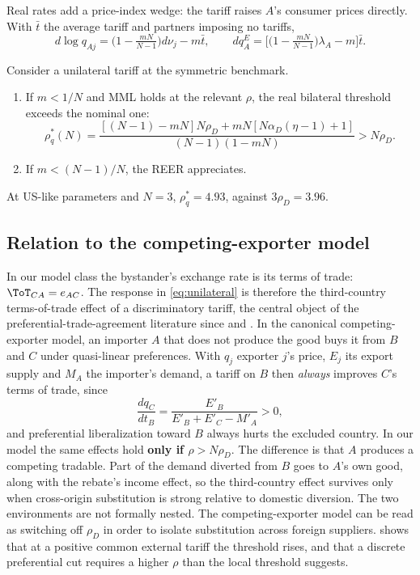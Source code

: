 Real rates add a price-index wedge: the tariff raises $A$'s consumer prices directly. With $\bar t$ the average tariff and partners imposing no tariffs,
\begin{equation}
d\log q_{Aj}=\Big(1-\tfrac{mN}{N-1}\Big)d\nu_j-m\bar t,\qquad
dq^E_A=\Big[\Big(1-\tfrac{mN}{N-1}\Big)\lambda_A-m\Big]\bar t.
\label{eq:real}
\end{equation}

\begin{proposition}
\label{prop:real}
Consider a unilateral tariff at the symmetric benchmark.
\begin{enumerate}[label=(\roman*)]
\item If $m<1/N$ and MML holds at the relevant $\rho$, the real bilateral threshold exceeds the nominal one:
\begin{equation*}
\rho^*_q(N)=\frac{[(N-1)-mN]N\rho_D+mN[N\alpha_D(\eta-1)+1]}{(N-1)(1-mN)}>N\rho_D.
\end{equation*}
\item If $m<(N-1)/N$, the REER appreciates.
\end{enumerate}
\end{proposition}

At US-like parameters and $N=3$, $\rho^*_q=4.93$, against $3\rho_D=3.96$.

\subsection{Relation to the competing-exporter model}
\label{sec:pta}

In our model class the bystander's exchange rate is its terms of trade: $\ToT_{CA}=e_{AC}$. The response in \cref{eq:unilateral} is therefore the third-country terms-of-trade effect of a discriminatory tariff, the central object of the preferential-trade-agreement literature since \citet{viner1950} and \citet{mundell1964}. In the canonical competing-exporter model, an importer $A$ that does not produce the good buys it from $B$ and $C$ under quasi-linear preferences. With $q_j$ exporter $j$'s price, $E_j$ its export supply and $M_A$ the importer's demand, a tariff on $B$ then \emph{always} improves $C$'s terms of trade, since
\begin{equation*}
\frac{dq_C}{dt_B}=\frac{E'_B}{E'_B+E'_C-M'_A}>0,
\end{equation*}
and preferential liberalization toward $B$ always hurts the excluded country. In our model the same effects hold \textbf{only if $\rho>N\rho_D$}. The difference is that $A$ produces a competing tradable. Part of the demand diverted from $B$ goes to $A$'s own good, along with the rebate's income effect, so the third-country effect survives only when cross-origin substitution is strong relative to domestic diversion. The two environments are not formally nested. The competing-exporter model can be read as switching off $\rho_D$ in order to isolate substitution across foreign suppliers.  shows that at a positive common external tariff the threshold rises, and that a discrete preferential cut requires a higher $\rho$ than the local threshold suggests.
